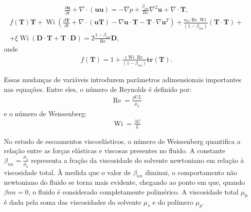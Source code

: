 \begin{equation}
    \begin{split}
        \frac{\partial \mathbf{u}}{\partial t} + \nabla \cdot (\mathbf{uu}) = -\nabla p + \frac{\beta_{nn}}{Re} \nabla^2 \mathbf{u} + \nabla \cdot \mathbf{T},
\end{split}\label{eq_conservacao_momentum_nao_newtoniano_admensional}
\end{equation}
\begin{equation}
    \begin{split}
        f(\mathbf{T})\mathbf{T} + \operatorname{Wi} \left( \frac{\partial \mathbf{T}}{\partial t} + \nabla \cdot (\mathbf{u T}) - \nabla \mathbf{u} \cdot \mathbf{T} - \mathbf{T} \cdot \nabla \mathbf{u}^T \right) + \frac{\alpha_{G} \operatorname{Re} \operatorname{Wi}}{(1 - \beta_{nn})} (\mathbf{T} \cdot \mathbf{T}) + \\ + \xi \operatorname{Wi} \left( \mathbf{D} \cdot \mathbf{T} + \mathbf{T} \cdot\mathbf{D}\right) = 2 \frac{1 - \beta_{nn}}{\operatorname{Re}} \mathbf{D},
    \end{split}\label{eq_tensores_lpog_admensional}
\end{equation}
onde
\begin{equation}
    \begin{split}
        f(\mathbf{T}) = 1+\frac{\epsilon \operatorname{Wi} \operatorname{Re}}{(1 - \beta_{nn})}\textbf{tr}(\mathbf{T}).
    \end{split}\label{eq_funcao_traco_tensor}
\end{equation}

Essas mudanças de variáveis introduzem parâmetros adimensionais importantes nas equações. Entre eles, o número de Reynolds é definido por:
\begin{equation}
    \begin{split}
        \operatorname{Re} = \frac{\rho U L}{\mu_0}
    \end{split}\label{eq_ReynoldsNumber}
\end{equation}
e o número de Weissenberg:
\begin{equation}
    \begin{split}
        \operatorname{Wi} = \frac{\lambda U}{L}
    \end{split}\label{eq_WeissenbergNumber}
\end{equation}

No estudo de escoamentos viscoelásticos, o número de Weissenberg quantifica a relação entre as forças elásticas e viscosas presentes no fluido. A constante $\beta_{nn} = \frac{\mu_s}{\mu_0}$ representa a fração da viscosidade do solvente newtoniano em relação à viscosidade total. À medida que o valor de $\beta_{nn}$ diminui, o comportamento não newtoniano do fluido se torna mais evidente, chegando ao ponto em que, quando $\beta{nn} = 0$, o fluido é considerado completamente polimérico. A viscosidade total $\mu_0$ é dada pela soma das viscosidades do solvente $\mu_s$ e do polímero $\mu_p$.

